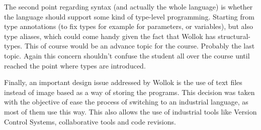 The second point regarding syntax (and actually the whole language) is whether
the language should support some kind of type-level programming. Starting from
type annotations (to fix types for example for parameters, or variables), but
also type aliases, which could come handy given the fact that Wollok has
structural-types. This of course would be an advance topic for the course.
Probably the last topic. Again this concern shouldn't confuse the student all
over the course until reached the point where types are introduced.

Finally, an important design issue addressed by Wollok is the use of text files instead of image
based as a way of storing the programs. This decision was taken with the objective of ease the 
process of switching to an industrial language, as most of them use this way. 
This also allows the use of industrial tools like Version Control Systems, collaborative tools 
and code revisions.

